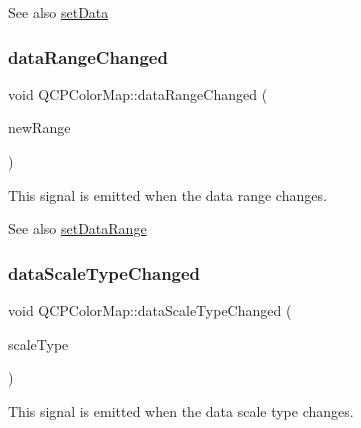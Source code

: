 \begin{DoxySeeAlso}{See also}
\hyperlink{classQCPColorMap_a5a23e133a20c4ccad35fd32e6c0f9809}{set\+Data} 
\end{DoxySeeAlso}
\mbox{\label{classQCPColorMap_a83ae5be3903da493f732e1a5c14fd807}} 
\subsubsection{\texorpdfstring{data\+Range\+Changed}{dataRangeChanged}}
{\footnotesize\ttfamily void Q\+C\+P\+Color\+Map\+::data\+Range\+Changed (\begin{DoxyParamCaption}\item[{const \hyperlink{classQCPRange}{Q\+C\+P\+Range} \&}]{new\+Range }\end{DoxyParamCaption})\hspace{0.3cm}{\ttfamily [signal]}}

This signal is emitted when the data range changes.

\begin{DoxySeeAlso}{See also}
\hyperlink{classQCPColorMap_a980b42837821159786a85b4b7dcb8774}{set\+Data\+Range} 
\end{DoxySeeAlso}
\mbox{\label{classQCPColorMap_a978d5d5c9f68cffef8c902b855c04490}} 
\subsubsection{\texorpdfstring{data\+Scale\+Type\+Changed}{dataScaleTypeChanged}}
{\footnotesize\ttfamily void Q\+C\+P\+Color\+Map\+::data\+Scale\+Type\+Changed (\begin{DoxyParamCaption}\item[{\hyperlink{classQCPAxis_a36d8e8658dbaa179bf2aeb973db2d6f0}{Q\+C\+P\+Axis\+::\+Scale\+Type}}]{scale\+Type }\end{DoxyParamCaption})\hspace{0.3cm}{\ttfamily [signal]}}

This signal is emitted when the data scale type changes.

